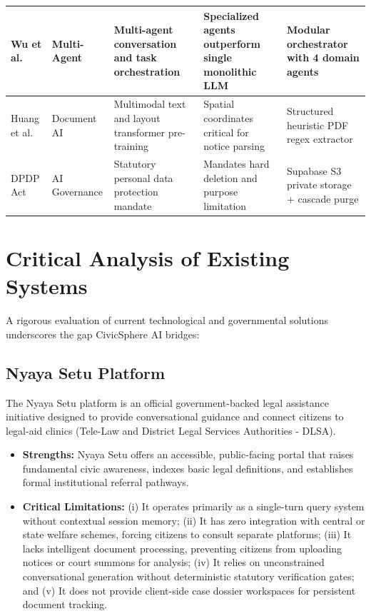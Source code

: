 \begin{table}[H]
{\begin{tabular}{|l|l|p{4.5cm}|p{5cm}|p{4.5cm}|}
Wu et al.~\cite{wu2023autogen} & Multi-Agent & Multi-agent conversation and task orchestration & Specialized agents outperform single monolithic LLM & Modular orchestrator with 4 domain agents \\ \hline
Huang et al.~\cite{huang2022layoutlmv3} & Document AI & Multimodal text and layout transformer pre-training & Spatial coordinates critical for notice parsing & Structured heuristic PDF regex extractor \\ \hline
DPDP Act~\cite{dpdpact2023} & AI Governance & Statutory personal data protection mandate & Mandates hard deletion and purpose limitation & Supabase S3 private storage + cascade purge \\ \hline
\end{tabular}%
}
\end{table}

\section{Critical Analysis of Existing Systems}
\label{sec:existing_systems_critique}
A rigorous evaluation of current technological and governmental solutions underscores the gap CivicSphere AI bridges:

\subsection{Nyaya Setu Platform}
The Nyaya Setu platform is an official government-backed legal assistance initiative designed to provide conversational guidance and connect citizens to legal-aid clinics (Tele-Law and District Legal Services Authorities - DLSA).
\begin{itemize}
    \item \textbf{Strengths:} Nyaya Setu offers an accessible, public-facing portal that raises fundamental civic awareness, indexes basic legal definitions, and establishes formal institutional referral pathways.
    \item \textbf{Critical Limitations:} (i) It operates primarily as a single-turn query system without contextual session memory; (ii) It has zero integration with central or state welfare schemes, forcing citizens to consult separate platforms; (iii) It lacks intelligent document processing, preventing citizens from uploading notices or court summons for analysis; (iv) It relies on unconstrained conversational generation without deterministic statutory verification gates; and (v) It does not provide client-side case dossier workspaces for persistent document tracking.
\end{itemize}

